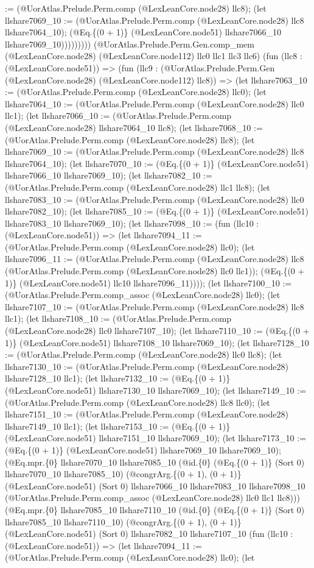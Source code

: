 \documentclass[11pt]{article}
\begin{document}
:= (@UorAtlas.Prelude.Perm.comp (@LexLeanCore.node28) llc8); (let llshare7069\_10 := (@UorAtlas.Prelude.Perm.comp (@LexLeanCore.node28) llc8 llshare7064\_10); (@Eq.\{(0 + 1)\} (@LexLeanCore.node51) llshare7066\_10 llshare7069\_10))))))))) (@UorAtlas.Prelude.Perm.Gen.comp\_mem (@LexLeanCore.node28) (@LexLeanCore.node112) llc0 llc1 llc3 llc6) (fun (llc8 : (@LexLeanCore.node51)) => (fun (llc9 : (@UorAtlas.Prelude.Perm.Gen (@LexLeanCore.node28) (@LexLeanCore.node112) llc8)) => (let llshare7063\_10 := (@UorAtlas.Prelude.Perm.comp (@LexLeanCore.node28) llc0); (let llshare7064\_10 := (@UorAtlas.Prelude.Perm.comp (@LexLeanCore.node28) llc0 llc1); (let llshare7066\_10 := (@UorAtlas.Prelude.Perm.comp (@LexLeanCore.node28) llshare7064\_10 llc8); (let llshare7068\_10 := (@UorAtlas.Prelude.Perm.comp (@LexLeanCore.node28) llc8); (let llshare7069\_10 := (@UorAtlas.Prelude.Perm.comp (@LexLeanCore.node28) llc8 llshare7064\_10); (let llshare7070\_10 := (@Eq.\{(0 + 1)\} (@LexLeanCore.node51) llshare7066\_10 llshare7069\_10); (let llshare7082\_10 := (@UorAtlas.Prelude.Perm.comp (@LexLeanCore.node28) llc1 llc8); (let llshare7083\_10 := (@UorAtlas.Prelude.Perm.comp (@LexLeanCore.node28) llc0 llshare7082\_10); (let llshare7085\_10 := (@Eq.\{(0 + 1)\} (@LexLeanCore.node51) llshare7083\_10 llshare7069\_10); (let llshare7098\_10 := (fun (llc10 : (@LexLeanCore.node51)) => (let llshare7094\_11 := (@UorAtlas.Prelude.Perm.comp (@LexLeanCore.node28) llc0); (let llshare7096\_11 := (@UorAtlas.Prelude.Perm.comp (@LexLeanCore.node28) llc8 (@UorAtlas.Prelude.Perm.comp (@LexLeanCore.node28) llc0 llc1)); (@Eq.\{(0 + 1)\} (@LexLeanCore.node51) llc10 llshare7096\_11)))); (let llshare7100\_10 := (@UorAtlas.Prelude.Perm.comp\_assoc (@LexLeanCore.node28) llc0); (let llshare7107\_10 := (@UorAtlas.Prelude.Perm.comp (@LexLeanCore.node28) llc8 llc1); (let llshare7108\_10 := (@UorAtlas.Prelude.Perm.comp (@LexLeanCore.node28) llc0 llshare7107\_10); (let llshare7110\_10 := (@Eq.\{(0 + 1)\} (@LexLeanCore.node51) llshare7108\_10 llshare7069\_10); (let llshare7128\_10 := (@UorAtlas.Prelude.Perm.comp (@LexLeanCore.node28) llc0 llc8); (let llshare7130\_10 := (@UorAtlas.Prelude.Perm.comp (@LexLeanCore.node28) llshare7128\_10 llc1); (let llshare7132\_10 := (@Eq.\{(0 + 1)\} (@LexLeanCore.node51) llshare7130\_10 llshare7069\_10); (let llshare7149\_10 := (@UorAtlas.Prelude.Perm.comp (@LexLeanCore.node28) llc8 llc0); (let llshare7151\_10 := (@UorAtlas.Prelude.Perm.comp (@LexLeanCore.node28) llshare7149\_10 llc1); (let llshare7153\_10 := (@Eq.\{(0 + 1)\} (@LexLeanCore.node51) llshare7151\_10 llshare7069\_10); (let llshare7173\_10 := (@Eq.\{(0 + 1)\} (@LexLeanCore.node51) llshare7069\_10 llshare7069\_10); (@Eq.mpr.\{0\} llshare7070\_10 llshare7085\_10 (@id.\{0\} (@Eq.\{(0 + 1)\} (Sort 0) llshare7070\_10 llshare7085\_10) (@congrArg.\{(0 + 1), (0 + 1)\} (@LexLeanCore.node51) (Sort 0) llshare7066\_10 llshare7083\_10 llshare7098\_10 (@UorAtlas.Prelude.Perm.comp\_assoc (@LexLeanCore.node28) llc0 llc1 llc8))) (@Eq.mpr.\{0\} llshare7085\_10 llshare7110\_10 (@id.\{0\} (@Eq.\{(0 + 1)\} (Sort 0) llshare7085\_10 llshare7110\_10) (@congrArg.\{(0 + 1), (0 + 1)\} (@LexLeanCore.node51) (Sort 0) llshare7082\_10 llshare7107\_10 (fun (llc10 : (@LexLeanCore.node51)) => (let llshare7094\_11 := (@UorAtlas.Prelude.Perm.comp (@LexLeanCore.node28) llc0); (let 
\end{document}
